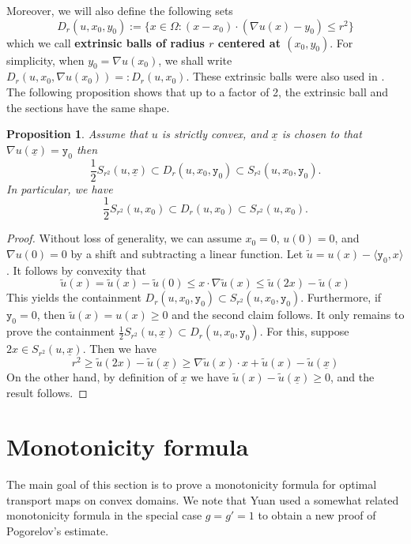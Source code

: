 \documentclass[12pt,reqno]{amsart}
\newtheorem{prop}{Proposition}[section]
\numberwithin{equation}{section}
\begin{document}
Moreover, we will also define the following sets 
\[D_r(u, x_0,y_0) := \{x\in\Omega: (x-x_0)\cdot (\nabla u(x)-y_0)\leq r^2\}\]
which we call {\bf extrinsic balls of radius $r$ centered at $(x_0,y_0)$}.  For simplicity, when $y_0=\nabla u(x_0) $, we shall write $D_r(u, x_0,\nabla u(x_0))=: D_r(u,x_0)$.  These extrinsic balls were also used in \cite{Yuan}. 
The following proposition shows that up to a factor of 2, the extrinsic ball and the sections have the same shape. 
\begin{prop}\label{prop: comparison between sections and extrinsic ball}
Assume that $u$ is strictly convex, and $\underline{x}$ is chosen to that $\nabla u(\underline{x}) = \mathtt{y}_0$ then 
    \[\frac{1}{2}S_{r^2}(u, \underline{x})\subset D_r(u, x_0,\mathtt{y}_0)\subset S_{r^2}(u, x_0, \mathtt{y}_0).\]
    In particular, we have
    \[
    \frac{1}{2}S_{r^2}(u, x_0)\subset D_r(u, x_0)\subset S_{r^2}(u, x_0).
    \]
\end{prop}
\begin{proof}
    Without loss of generality, we can assume $x_0 = 0$, $u(0) =0$, and $\nabla u(0) = 0$ by a shift and subtracting a linear function.  Let $\tilde{u} =u(x)- \langle \mathtt{y}_0,x\rangle$. It follows by convexity that 
    \[
        \tilde{u}(x)=\tilde{u}(x)-\tilde{u}(0) \leq x\cdot \nabla\tilde{u}(x) \leq \tilde{u}(2x)- \tilde{u}(x)
        \] 
        This yields the containment $D_r(u, x_0,\mathtt{y}_0)\subset S_{r^2}(u, x_0, \mathtt{y}_0)$.  Furthermore, if $\mathtt{y}_0=0$, then $\tilde{u}(x)=u(x) \geq 0$ and the second claim follows.  It only remains to prove the containment $\frac{1}{2}S_{r^2}(u, \underline{x})\subset D_r(u, x_0,\mathtt{y}_0)$.  For this, suppose $2x\in S_{r^2}(u,\underline{x})$.  Then we have
        \[
        r^2 \geq \tilde{u}(2x) - \tilde{u}(\underline{x}) \geq \nabla \tilde{u}(x) \cdot x + \tilde{u}(x) - \tilde{u}(\underline{x})
        \]
        On the other hand, by definition of $\underline{x}$ we have $\tilde{u}(x) - \tilde{u}(\underline{x}) \geq 0$, and the result follows.
\end{proof}

\section{Monotonicity formula}\label{sec: monotonicity-formula}
The main goal of this section is to prove a monotonicity formula for optimal transport maps on convex domains.  We note that  Yuan \cite{Yuan} used a somewhat related monotonicity formula in the special case $g=g'=1$ to obtain a new proof of Pogorelov's estimate. 
\end{document}
